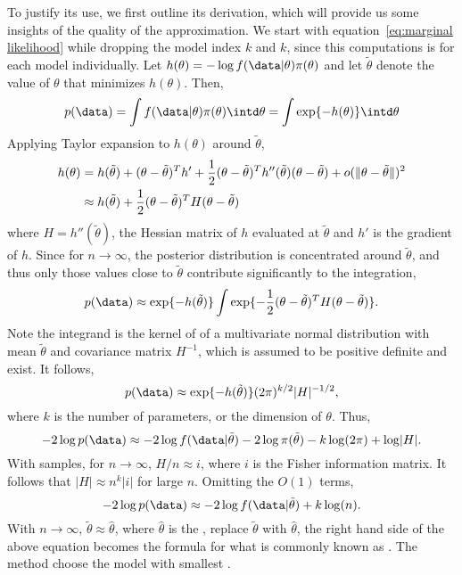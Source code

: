 To justify its use, we first outline its derivation, which will provide us
some insights of the quality of the approximation. We start with
equation~\eqref{eq:marginal likelihood} while dropping the model index $k$ and
$k$, since this computations is for each model individually. Let $h(\theta) =
- \log f(\data|\theta)\pi(\theta)$ and let $\tilde\theta$ denote the value of
$\theta$ that minimizes $h(\theta)$. Then,
\begin{equation}
  p(\data) = \int f(\data|\theta)\pi(\theta)\intd\theta = \int\exp\{-h(\theta)\}\intd\theta
\end{equation}
Applying Taylor expansion to $h(\theta)$ around $\tilde\theta$,
\begin{align}
  h(\theta)
  &= h(\tilde\theta) + (\theta - \tilde\theta)^T h'
  + \frac{1}{2}(\theta - \tilde\theta)^T h''(\tilde\theta)
  (\theta - \tilde\theta)
  + o(\lVert \theta - \tilde\theta \rVert)^2 \notag\\
  &\approx h(\tilde\theta) + \frac{1}{2}(\theta - \tilde\theta)^T H (\theta - \tilde\theta)
\end{align}
where $H = h''(\tilde\theta)$, the Hessian matrix of $h$ evaluated at
$\tilde\theta$ and $h'$ is the gradient of $h$. Since for $n\to\infty$, the
posterior distribution is concentrated around $\tilde\theta$, and thus only
those values close to $\tilde\theta$ contribute significantly to the
integration,
\begin{equation}
  p(\data)\approx\exp\{-h(\tilde\theta)\}
  \int\exp\{-\frac{1}{2}(\theta - \tilde\theta)^TH(\theta - \tilde\theta)\}.
\end{equation}
Note the integrand is the kernel of of a multivariate normal distribution with
mean $\tilde\theta$ and covariance matrix $H^{-1}$, which is assumed to be
positive definite and exist. It follows,
\begin{equation}
  p(\data) \approx \exp\{-h(\tilde\theta)\} (2\pi)^{k/2} \lvert H \rvert^{-1/2},
\end{equation}
where $k$ is the number of parameters, or the dimension of $\theta$. Thus,
\begin{equation}
  -2\log p(\data) \approx
  -2\log f(\data|\tilde\theta) - 2\log\pi(\tilde\theta) - k\log(2\pi) + \log\lvert H \rvert.
  \label{eq:bic approx}
\end{equation}
With \iid samples, for $n\to\infty$, $H/n \approx i$, where $i$ is the Fisher
information matrix. It follows that $\lvert H \rvert \approx n^k \lvert i
\rvert$ for large $n$. Omitting the $O(1)$ terms,
\begin{equation}
  -2\log p(\data) \approx -2\log f(\data|\tilde\theta) + k\log(n).
\end{equation}
With $n\to\infty$, $\tilde\theta\approx\hat{\theta}$, where $\hat{\theta}$ is
the \mle, replace $\tilde\theta$ with $\hat{\theta}$, the right hand side of the
above equation becomes the formula for what is commonly known as \bic. The
\bic method choose the model with smallest \bic.
